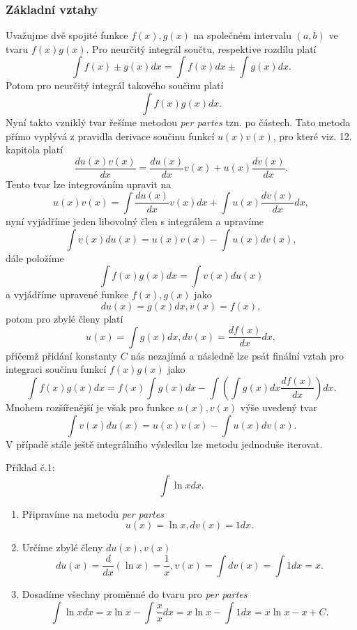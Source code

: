 \subsubsection{Základní vztahy}
Uvažujme dvě spojité funkce $f(x), g(x)$ na společném intervalu $(a,b)$ ve tvaru $f(x)g(x)$. Pro neurčitý integrál součtu, respektive rozdílu platí
$$
\int f(x)\pm g(x)dx = \int f(x) dx \pm \int g(x)dx.
$$
Potom pro neurčitý integrál takového součinu platí
$$
\int f(x)g(x)dx.
$$
Nyní takto vzniklý tvar řešíme metodou \textit{per partes} tzn. po částech. Tato metoda přímo vyplývá z pravidla derivace součinu funkcí $u(x)v(x)$, pro které viz. 12. kapitola platí
$$
\frac{du(x)v(x)}{dx} = \frac{du(x)}{dx}v(x) + u(x)\frac{dv(x)}{dx}.
$$
Tento tvar lze integrováním upravit na 
$$
u(x)v(x) = \int \frac{du(x)}{dx}v(x)dx + \int u(x)\frac{dv(x)}{dx}dx,
$$
nyní vyjádříme jeden libovolný člen s integrálem a upravíme
$$
\int v(x)du(x) = u(x)v(x) - \int u(x)dv(x),
$$
dále položíme 
$$
\int f(x)g(x)dx = \int v(x)du(x)
$$ 
a vyjádříme upravené funkce $f(x),g(x)$ jako
$$
du(x) = g(x)dx, v(x) = f(x),
$$
potom pro zbylé členy platí
$$
u(x) = \int g(x)dx, dv(x) = \frac{df(x)}{dx}dx,
$$
přičemž přidání konstanty $C$ nás nezajímá a následně lze psát finální vztah pro integraci součinu funkcí $f(x)g(x)$ jako 
$$
\int f(x)g(x)dx = f(x)\int g(x)dx - \int\left(\int g(x)dx \frac{df(x)}{dx}\right)dx.
$$
Mnohem rozšířenější je však pro funkce $u(x),v(x)$ výše uvedený tvar
$$
\int v(x)du(x) = u(x)v(x) - \int u(x)dv(x).
$$
V případě stále ještě integrálního výsledku lze metodu jednoduše iterovat.

Příklad č.1:
$$
\int \ln{x} dx.
$$
\begin{enumerate}
    \item Připravíme na metodu \textit{per partes} 
    $$
    u(x) = \ln{x}, dv(x) = 1 dx.
    $$
    \item Určíme zbylé členy $du(x), v(x)$
    $$
    du(x) = \frac{d}{dx}(\ln{x}) = \frac{1}{x}, v(x) = \int dv(x) = \int 1 dx = x.
    $$
    \item Dosadíme všechny proměnné do tvaru pro \textit{per partes}
    $$
    \int \ln{x} dx= x\ln{x} - \int \frac{x}{x}dx = x\ln{x} - \int1dx = x\ln{x} - x + C.
    $$
\end{enumerate}

